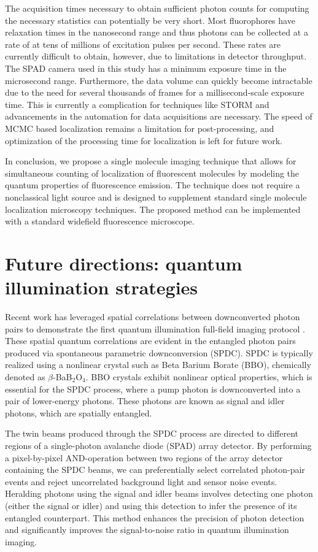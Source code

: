 The acquisition times necessary to obtain sufficient photon counts for computing the necessary statistics can potentially be very short. Most fluorophores have relaxation times in the nanosecond range and thus photons can be collected at a rate of at tens of millions of excitation pulses per second. These rates are currently difficult to obtain, however, due to limitations in detector throughput. The SPAD camera used in this study has a minimum exposure time in the microsecond range. Furthermore, the data volume can quickly become intractable due to the need for several thousands of frames for a millisecond-scale exposure time. This is currently a complication for techniques like STORM and advancements in the automation for data acquisitions are necessary. The speed of MCMC based localization remains a limitation for post-processing, and optimization of the processing time for localization is left for future work. 

In conclusion, we propose a single molecule imaging technique that allows for simultaneous counting of localization of fluorescent molecules by modeling the quantum properties of fluorescence emission. The technique does not require a nonclassical light source and is designed to supplement standard single molecule localization microscopy techniques. The proposed method can be implemented with a standard widefield fluorescence microscope.

\section{Future directions: quantum illumination strategies}

Recent work has leveraged spatial correlations between downconverted photon pairs to demonstrate the first quantum illumination full-field imaging protocol \parencite{Gregory2020}. These spatial quantum correlations are evident in the entangled photon pairs produced via spontaneous parametric downconversion (SPDC). SPDC is typically realized using a nonlinear crystal such as Beta Barium Borate (BBO), chemically denoted as $\beta$-BaB$_2$O$_4$. BBO crystals exhibit nonlinear optical properties, which is essential for the SPDC process, where a pump photon is downconverted into a pair of lower-energy photons. These photons are known as signal and idler photons, which are spatially entangled.

The twin beams produced through the SPDC process are directed to different regions of a single-photon avalanche diode (SPAD) array detector. By performing a pixel-by-pixel AND-operation between two regions of the array detector containing the SPDC beams, we can preferentially select correlated photon-pair events and reject uncorrelated background light and sensor noise events. Heralding photons using the signal and idler beams involves detecting one photon (either the signal or idler) and using this detection to infer the presence of its entangled counterpart. This method enhances the precision of photon detection and significantly improves the signal-to-noise ratio in quantum illumination imaging.


